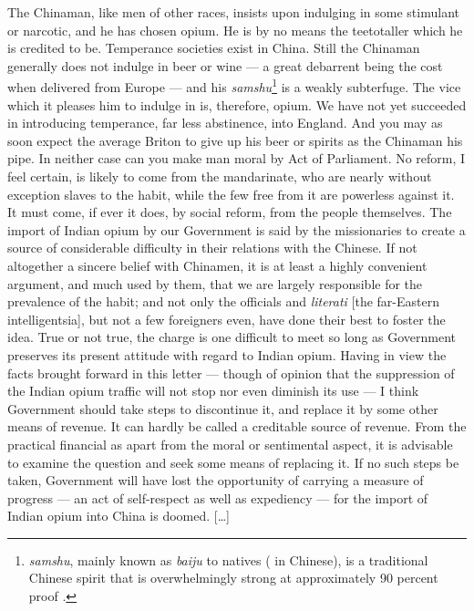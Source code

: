 \begin{fancyquote}
	[\ldots] The Chinaman, like men of other races, insists upon indulging in some stimulant or narcotic, and he has chosen opium. He is by no means the teetotaller which he is credited to be. Temperance societies exist in China. Still the Chinaman generally does not indulge in beer or wine --- a great debarrent being the cost when delivered from Europe --- and his \textit{samshu}\footnote{\textit{samshu}, mainly known as \textit{baiju} to natives ( in Chinese), is a traditional Chinese spirit that is overwhelmingly strong at approximately 90 percent proof
	\autocite{Antkiewicz:1993}.} is a weakly subterfuge. The vice which it pleases him to indulge in is, therefore, opium. We have not yet succeeded in introducing temperance, far less abstinence, into England. And you may as soon expect the average Briton to give up his beer or spirits as the Chinaman his pipe. In neither case can you make man moral by Act of Parliament. No reform, I feel certain, is likely to come from the mandarinate, who are nearly without exception slaves to the habit, while the few free from it are powerless against it. It must come, if ever it does, by social reform, from the people themselves. The import of Indian opium by our Government is said by the missionaries to create a source of considerable difficulty in their relations with the Chinese. If not altogether a sincere belief with Chinamen, it is at least a highly convenient argument, and much used by them, that we are largely responsible for the prevalence of the habit; and not only the officials and \textit{literati} [the far-Eastern intelligentsia], but not a few foreigners even, have done their best to foster the idea. True or not true, the charge is one difficult to meet so long as Government preserves its present attitude with regard to Indian opium. Having in view the facts brought forward in this letter --- though of opinion that the suppression of the Indian opium traffic will not stop nor even diminish its use --- I think Government should take steps to discontinue it, and replace it by some other means of revenue. It can hardly be called a creditable source of revenue. From the practical financial as apart from the moral or sentimental aspect, it is advisable to examine the question and seek some means of replacing it. If no such steps be taken, Government will have lost the opportunity of carrying a measure of progress --- an act of self-respect as well as expediency --- for the import of Indian opium into China is doomed. [\ldots]
	\begin{flushright}
		\autocite{SpecialCorrespondent:1884}
	\end{flushright}
\end{fancyquote}
